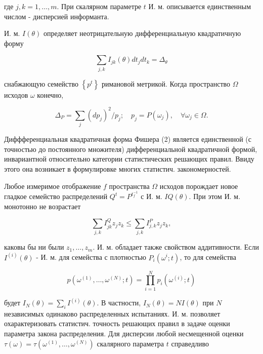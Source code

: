 \documentclass[10pt]{article}
\begin{document}
где $j, k=1, \ldots, m$. При скалярном параметре $t$ И. м. описывается единственным числом - дисперсией информанта.



И. м. $I(\theta)$ определяет неотрицательную дифференциальную квадратичную форму



\[

\sum_{j, k} I_{j k}(\theta) d t_{j} d t_{k}=\Delta_{\theta}

\]



снабжающую семейство $\left\{p^{t}\right\}$ римановой метрикой. Когда пространство $\Omega$ исходов $\omega$ конечно,



\[

\Delta_{P}=\sum_{j}\left(d p_{j}\right)^{2} / p_{j} ; \quad p_{j}=P\left(\omega_{j}\right), \quad \forall \omega_{j} \in \Omega .

\]



Диффференциальная квадратичная форма Фишера (2) является единственной (с точностью до постоянного множителя) дифференциальной квадратичной формой, инвариантной относительно категории статистических решающих правил. Ввиду этого она возникает в формулировке многих статистич. закономерностей.



Любое измеримое отображение $f$ пространства $\Omega$ исходов порождает новое гладкое семейство распределений $Q^{t}=P^{t_{f}^{-1}}$ с И. м. $I Q(\theta)$. При этом И. м. монотонно не возрастает



\[

\sum_{j, k} I_{j k}^{Q} z_{j} z_{k} \leqslant \sum_{j, k} I_{j, k}^{P} z_{j} z_{k},

\]



каковы бы ни были $z_{1}, \ldots, z_{m}$. И. м. обладает также свойством аддитивности. Если $I^{(i)}(\theta)$ - И. м. для семейства с плотностью $P_{i}\left(\omega^{i} ; t\right)$, то для семейства



\[

p\left(\omega^{(1)}, \ldots, \omega^{(N)} ; t\right)=\prod_{i=1}^{N} p_{i}\left(\omega^{(i)} ; t\right)

\]



будет $I_{N}(\theta)=\sum_{i} I^{(i)}(\theta)$. В частности, $I_{N}(\theta)=N I(\theta)$ при $N$ независимых одинаково распределенных испытаниях. И. м. позволяет охарактеризовать статистич. точность решающих правил в задаче оценки параметра закона распределения. Для дисперсии любой несмещенной оценки $\tau(\omega)=\tau\left(\omega^{(1)}, \ldots, \omega^{(N)}\right)$ скалярного параметра $t$ справедливо
\end{document}
